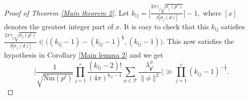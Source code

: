 \documentclass[reqno]{amsart}
\theoremstyle{plain}
\theoremstyle{definition}
\theoremstyle{remark}
\def\Nr{\mathrm{Nm}}
\begin{document}
\begin{proof}[Proof of Theorem \ref{Main theorem 2}]
Let $k_{lj}=\Big[\frac{2\pi \gamma_j\sqrt{\sigma_{j}({p}^l)}}{\delta|\sigma_j(d)|}\Big]-1,$ where $[x]$ denotes the greatest integer part of $x$.
It is easy to check that this $k_{lj} $ satisfies $\frac{2\pi \gamma_j\sqrt{\sigma_{j}({p}^l)}}{\delta|\sigma_j(d)|}\in \Big((k_{lj}  -1)-(k_{lj}  -1)^{\frac{1}{3}},(k_{lj}  -1)\Big).$  
This now satisfies the hypothesis in Corollary \ref{Main lemma 2} and we get 
\begin{equation}\label{lowerboundklj}
 \Bigg|\frac{1}{\sqrt{\Nr({p}^l)}} \prod_{j=1}^r  \frac{(k_{lj}-2)!}{(4\pi)^{k_{lj}-1} }
\sum_{{\phi}\in \mathcal{F} }\frac{\lambda^\phi_{\mathfrak{p}^l} }{\|\phi \|^2}  \Bigg|
\gg \prod_{j=1}^r (k_{lj}-1)^{-\frac{1}{3}}.
\end{equation}


\end{proof}
\end{document}
